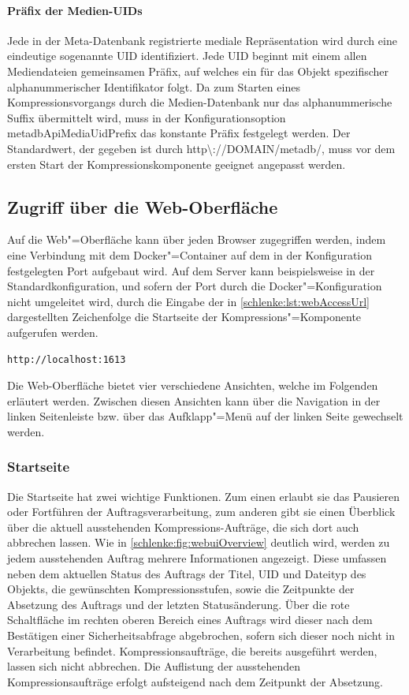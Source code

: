 \paragraph{Präfix der Medien-UIDs} Jede in der Meta-Datenbank registrierte mediale Repräsentation wird durch eine eindeutige sogenannte UID identifiziert. Jede UID beginnt mit einem allen Mediendateien gemeinsamen Präfix, auf welches ein für das Objekt spezifischer alphanummerischer Identifikator folgt. Da zum Starten eines Kompressionsvorgangs durch die Medien-Datenbank nur das alphanummerische Suffix übermittelt wird, muss in der Konfigurationsoption {\ttfamily metadb\-Api\-Media\-Uid\-Prefix} das konstante Präfix festgelegt werden. Der Standardwert, der gegeben ist durch {\ttfamily http\textbackslash ://DOMAIN/metadb/}, muss vor dem ersten Start der Kompressionskomponente geeignet angepasst werden.

\subsection{Zugriff über die Web-Oberfläche}

Auf die Web"=Oberfläche kann über jeden Browser zugegriffen werden, indem eine Verbindung mit dem Docker"=Container auf dem in der Konfiguration festgelegten Port aufgebaut wird. Auf dem Server kann beispielsweise in der Standardkonfiguration, und sofern der Port durch die Docker"=Konfiguration nicht umgeleitet wird, durch die Eingabe der in \autoref{schlenke:lst:webAccessUrl} dargestellten Zeichenfolge die Startseite der Kompressions"=Komponente aufgerufen werden.
\begin{lstlisting}[caption={Zugriff auf die Web-Oberfläche der Kompressions-Komponente},label=schlenke:lst:webAccessUrl]
	http://localhost:1613
\end{lstlisting}
Die Web-Oberfläche bietet vier verschiedene Ansichten, welche im Folgenden erläutert werden. Zwischen diesen Ansichten kann über die Navigation in der linken Seitenleiste bzw. über das Aufklapp"=Menü auf der linken Seite gewechselt werden.

\subsubsection{Startseite}

Die Startseite hat zwei wichtige Funktionen. Zum einen erlaubt sie das Pausieren oder Fortführen der Auftragsverarbeitung, zum anderen gibt sie einen Überblick über die aktuell ausstehenden Kompressions-Aufträge, die sich dort auch abbrechen lassen. Wie in \autoref{schlenke:fig:webuiOverview} deutlich wird, werden zu jedem ausstehenden Auftrag mehrere Informationen angezeigt. Diese umfassen neben dem aktuellen Status des Auftrags der Titel, UID und Dateityp des Objekts, die gewünschten Kompressionsstufen, sowie die Zeitpunkte der Absetzung des Auftrags und der letzten Statusänderung. Über die rote Schaltfläche im rechten oberen Bereich eines Auftrags wird dieser nach dem Bestätigen einer Sicherheitsabfrage abgebrochen, sofern sich dieser noch nicht in Verarbeitung befindet. Kompressionsaufträge, die bereits ausgeführt werden, lassen sich nicht abbrechen. Die Auflistung der ausstehenden Kompressionsaufträge erfolgt aufsteigend nach dem Zeitpunkt der Absetzung.

